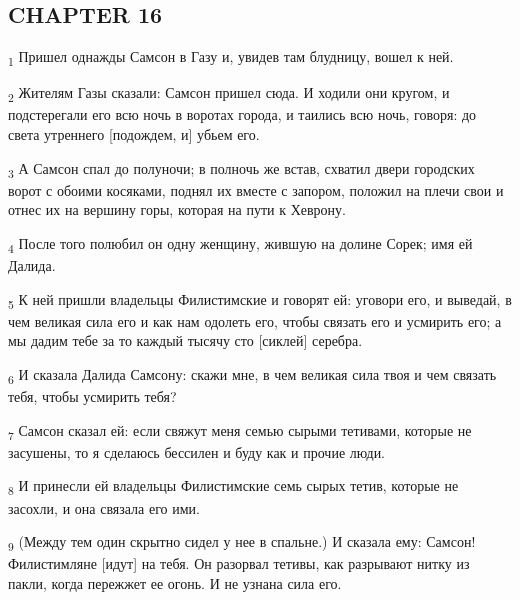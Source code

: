\subsection{CHAPTER 16}
\begin{tcolorbox}
\textsubscript{1} Пришел однажды Самсон в Газу и, увидев там блудницу, вошел к ней.
\end{tcolorbox}
\begin{tcolorbox}
\textsubscript{2} Жителям Газы сказали: Самсон пришел сюда. И ходили они кругом, и подстерегали его всю ночь в воротах города, и таились всю ночь, говоря: до света утреннего [подождем, и] убьем его.
\end{tcolorbox}
\begin{tcolorbox}
\textsubscript{3} А Самсон спал до полуночи; в полночь же встав, схватил двери городских ворот с обоими косяками, поднял их вместе с запором, положил на плечи свои и отнес их на вершину горы, которая на пути к Хеврону.
\end{tcolorbox}
\begin{tcolorbox}
\textsubscript{4} После того полюбил он одну женщину, жившую на долине Сорек; имя ей Далида.
\end{tcolorbox}
\begin{tcolorbox}
\textsubscript{5} К ней пришли владельцы Филистимские и говорят ей: уговори его, и выведай, в чем великая сила его и как нам одолеть его, чтобы связать его и усмирить его; а мы дадим тебе за то каждый тысячу сто [сиклей] серебра.
\end{tcolorbox}
\begin{tcolorbox}
\textsubscript{6} И сказала Далида Самсону: скажи мне, в чем великая сила твоя и чем связать тебя, чтобы усмирить тебя?
\end{tcolorbox}
\begin{tcolorbox}
\textsubscript{7} Самсон сказал ей: если свяжут меня семью сырыми тетивами, которые не засушены, то я сделаюсь бессилен и буду как и прочие люди.
\end{tcolorbox}
\begin{tcolorbox}
\textsubscript{8} И принесли ей владельцы Филистимские семь сырых тетив, которые не засохли, и она связала его ими.
\end{tcolorbox}
\begin{tcolorbox}
\textsubscript{9} (Между тем один скрытно сидел у нее в спальне.) И сказала ему: Самсон! Филистимляне [идут] на тебя. Он разорвал тетивы, как разрывают нитку из пакли, когда пережжет ее огонь. И не узнана сила его.
\end{tcolorbox}
